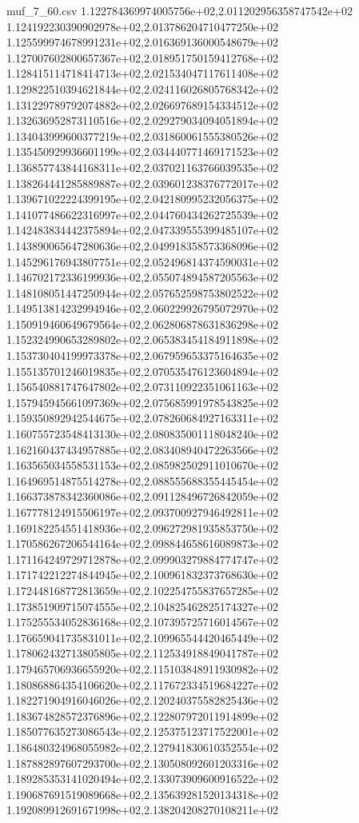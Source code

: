 \begin{filecontents*}{muf_7_60.csv}
1.122784369974005756e+02,2.011202956358747542e+02
1.124192230390902978e+02,2.013786204710477250e+02
1.125599974678991231e+02,2.016369136000548679e+02
1.127007602800657367e+02,2.018951750159412768e+02
1.128415114718414713e+02,2.021534047117611408e+02
1.129822510394621844e+02,2.024116026805768342e+02
1.131229789792074882e+02,2.026697689154334512e+02
1.132636952873110516e+02,2.029279034094051894e+02
1.134043999600377219e+02,2.031860061555380526e+02
1.135450929936601199e+02,2.034440771469171523e+02
1.136857743844168311e+02,2.037021163766039535e+02
1.138264441285889887e+02,2.039601238376772017e+02
1.139671022224399195e+02,2.042180995232056375e+02
1.141077486622316997e+02,2.044760434262725539e+02
1.142483834442375894e+02,2.047339555399485107e+02
1.143890065647280636e+02,2.049918358573368096e+02
1.145296176943807751e+02,2.052496814374590031e+02
1.146702172336199936e+02,2.055074894587205563e+02
1.148108051447250944e+02,2.057652598753802522e+02
1.149513814232994946e+02,2.060229926795072970e+02
1.150919460649679564e+02,2.062806878631836298e+02
1.152324990653289802e+02,2.065383454184911898e+02
1.153730404199973378e+02,2.067959653375164635e+02
1.155135701246019835e+02,2.070535476123604894e+02
1.156540881747647802e+02,2.073110922351061163e+02
1.157945945661097369e+02,2.075685991978543825e+02
1.159350892942544675e+02,2.078260684927163311e+02
1.160755723548413130e+02,2.080835001118048240e+02
1.162160437434957885e+02,2.083408940472263566e+02
1.163565034558531153e+02,2.085982502911010670e+02
1.164969514875514278e+02,2.088555688355445454e+02
1.166373878342360086e+02,2.091128496726842059e+02
1.167778124915506197e+02,2.093700927946492811e+02
1.169182254551418936e+02,2.096272981935853750e+02
1.170586267206544164e+02,2.098844658616089873e+02
1.171164249729712878e+02,2.099903279884774747e+02
1.171742212274844945e+02,2.100961832373768630e+02
1.172448168772813659e+02,2.102254755837657285e+02
1.173851909715074555e+02,2.104825462825174327e+02
1.175255534052836168e+02,2.107395725716014567e+02
1.176659041735831011e+02,2.109965544420465449e+02
1.178062432713805805e+02,2.112534918849041787e+02
1.179465706936655920e+02,2.115103848911930982e+02
1.180868864354106620e+02,2.117672334519684227e+02
1.182271904916046026e+02,2.120240375582825436e+02
1.183674828572376896e+02,2.122807972011914899e+02
1.185077635273086543e+02,2.125375123717522001e+02
1.186480324968055982e+02,2.127941830610352554e+02
1.187882897607293700e+02,2.130508092601203316e+02
1.189285353141020494e+02,2.133073909600916522e+02
1.190687691519089668e+02,2.135639281520134318e+02
1.192089912691671998e+02,2.138204208270108211e+02

\end{filecontents*}
